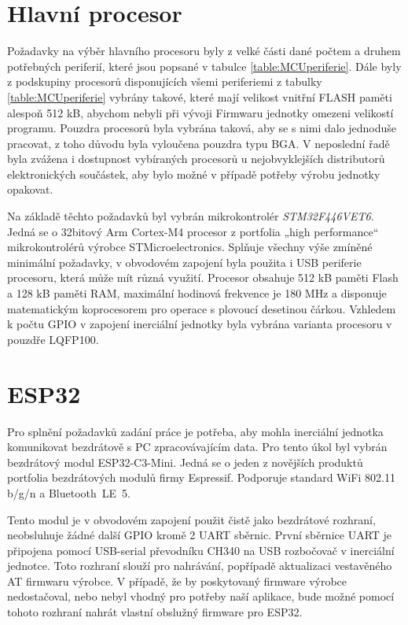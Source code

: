 \section{Hlavní procesor}
Požadavky na výběr hlavního procesoru byly z velké části dané počtem a druhem potřebných periferií, které jsou popsané v tabulce \ref{table:MCUperiferie}.
Dále byly z podskupiny procesorů disponujících všemi periferiemi z tabulky \ref{table:MCUperiferie} vybrány takové, které mají velikost vnitřní FLASH paměti alespoň 512 kB, abychom nebyli při vývoji Firmwaru jednotky omezeni velikostí programu. Pouzdra procesorů byla vybrána taková, aby se s nimi dalo jednoduše pracovat, z toho důvodu byla vyloučena pouzdra typu \ac{BGA}. 
V neposlední řadě byla zvážena i dostupnost vybíraných procesorů u nejobvyklejších distributorů elektronických součástek, aby bylo možné v případě potřeby výrobu jednotky opakovat.



Na základě těchto požadavků byl vybrán mikrokontrolér \emph{STM32F446VET6}. Jedná se o 32bitový Arm Cortex-M4 procesor z portfolia „high performance“ mikrokontrolérů výrobce STMicroelectronics. Splňuje všechny výše zmíněné minimální požadavky, v obvodovém zapojení byla použita i USB periferie procesoru, která může mít různá využití. Procesor obsahuje 512 kB paměti Flash a 128 kB paměti RAM, maximální hodinová frekvence je 180 MHz a disponuje matematickým koprocesorem pro operace s plovoucí desetinou čárkou. Vzhledem k počtu \ac{GPIO} v zapojení inerciální jednotky byla vybrána varianta procesoru v pouzdře LQFP100. \cite{csdGtKJDMSdbwJ9r}

\section{ESP32}
Pro splnění požadavků zadání práce je potřeba, aby mohla inerciální jednotka komunikovat bezdrátově s PC zpracovávajícím data. Pro tento úkol byl vybrán bezdrátový modul ESP32-C3-Mini. Jedná se o jeden z novějších produktů portfolia bezdrátových modulů firmy Espressif. Podporuje standard WiFi 802.11 b/g/n a Bluetooth~LE~5. \cite{zJ7x5ye8Y5eJn1E2}

Tento modul je v obvodovém zapojení použit čistě jako bezdrátové rozhraní, neobsluhuje žádné další \ac{GPIO} kromě 2 \ac{UART} sběrnic. První sběrnice \ac{UART} je připojena pomocí USB-serial převodníku CH340 na \ac{USB} rozbočovač v inerciální jednotce. Toto rozhraní slouží pro nahrávání, popřípadě aktualizaci vestavěného AT firmwaru výrobce. V případě, že by poskytovaný firmware výrobce nedostačoval, nebo nebyl vhodný pro potřeby naší aplikace, bude možné pomocí tohoto rozhraní nahrát vlastní obslužný firmware pro ESP32.

